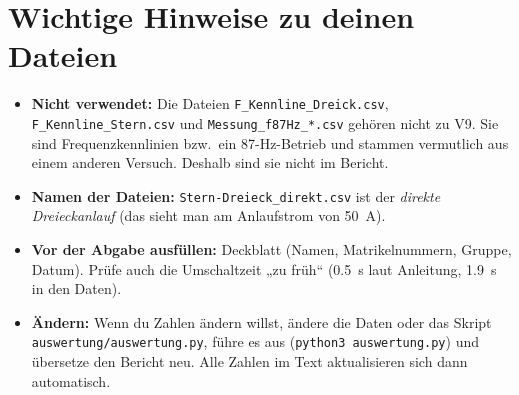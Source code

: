 \documentclass[11pt,a4paper]{article}
\begin{document}
\section{Wichtige Hinweise zu deinen Dateien}
\begin{itemize}
\item \textbf{Nicht verwendet:} Die Dateien \texttt{F\_Kennline\_Dreick.csv},
  \texttt{F\_Kennline\_Stern.csv} und \texttt{Messung\_f87Hz\_*.csv} gehören nicht zu V9.
  Sie sind Frequenzkennlinien bzw.\ ein 87-Hz-Betrieb und stammen vermutlich aus einem
  anderen Versuch. Deshalb sind sie nicht im Bericht.
\item \textbf{Namen der Dateien:} \texttt{Stern-Dreieck\_direkt.csv} ist der
  \emph{direkte Dreieckanlauf} (das sieht man am Anlaufstrom von \SI{50}{A}).
\item \textbf{Vor der Abgabe ausfüllen:} Deckblatt (Namen, Matrikelnummern, Gruppe, Datum).
  Prüfe auch die Umschaltzeit „zu früh“ (\SI{0,5}{s} laut Anleitung, \SI{1,9}{s} in den Daten).
\item \textbf{Ändern:} Wenn du Zahlen ändern willst, ändere die Daten oder das Skript
  \texttt{auswertung/auswertung.py}, führe es aus (\texttt{python3 auswertung.py}) und
  übersetze den Bericht neu. Alle Zahlen im Text aktualisieren sich dann automatisch.
\end{itemize}
\end{document}
